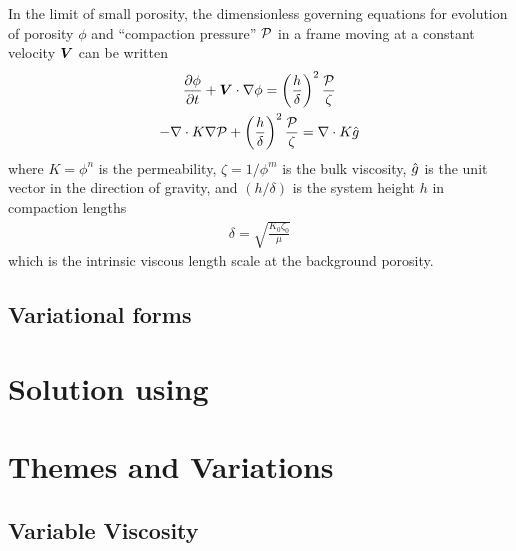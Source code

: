 In the limit of small porosity, the dimensionless governing equations for evolution
of porosity $\phi$ and ``compaction pressure'' $\mathcal{P}$ in a frame
moving at a constant velocity ${\mbox{\boldmath$V$}}$ can be written
\begin{gather}
  \frac{\partial\phi}{\partial t} + {\mbox{\boldmath$V$}}\cdot\nabla\phi = 
  \left(
    \frac{h}{\delta}
  \right)^{2}\frac{\mathcal{P}}{\zeta}  \label{eq:5.1}\\
-\nabla\cdot K \nabla\mathcal{P} + \left(
    \frac{h}{\delta}
  \right)^{2}\frac{\mathcal{P}}{\zeta} = \nabla\cdot K \hat{g}    \label{eq:5.2}
\end{gather}
where $K=\phi^{n}$ is the permeability, $\zeta = 1/\phi^{m}$ is the
bulk viscosity, $\hat{g}$ is the unit vector in the direction of
gravity, and $(h/\delta)$ is the system height $h$ in compaction lengths
\begin{gather}
  \delta = \sqrt{\frac{K_{0}\zeta_0}{\mu}}
\end{gather}
which is the intrinsic viscous length scale at the background
porosity.  



\subsection{Variational forms}
\label{sec:variational-forms}



\section{Solution using \TF}
\label{sec:solution-using-tf}



\section{Themes and Variations}
\label{sec:themes-variations}


\subsection{Variable Viscosity}
\label{sec:variable-viscosity}


